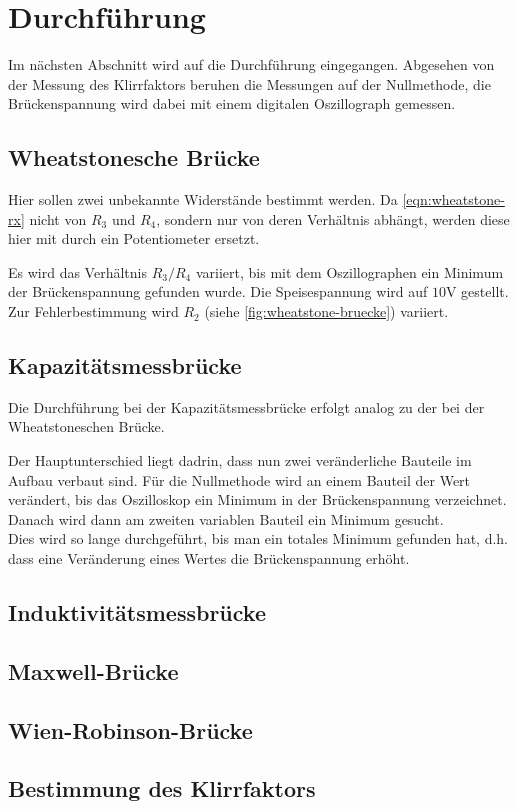 \section{Durchführung}
\label{sec:Durchführung}
Im nächsten Abschnitt wird auf die Durchführung eingegangen. Abgesehen von der Messung des
Klirrfaktors beruhen die Messungen auf der 
Nullmethode, die Brückenspannung wird dabei mit einem digitalen Oszillograph gemessen.

\subsection{Wheatstonesche Brücke}
\label{sec:exec-wheatstone}

Hier sollen zwei unbekannte Widerstände bestimmt werden. Da \autoref{eqn:wheatstone-rx} nicht von 
$R_3$ und $R_4$, sondern nur von deren Verhältnis abhängt,
werden diese hier mit durch ein Potentiometer ersetzt.

Es wird das Verhältnis $R_3/R_4$ variiert, bis mit dem Oszillographen ein Minimum der Brückenspannung
gefunden wurde. Die Speisespannung wird auf $10\si{\volt}$ gestellt. Zur Fehlerbestimmung wird $R_2$
(siehe \autoref{fig:wheatstone-bruecke}) variiert.

\subsection{Kapazitätsmessbrücke}
\label{sec:exec-kapazitaetsmessbrueck}

Die Durchführung bei der Kapazitätsmessbrücke erfolgt analog zu der bei der Wheatstoneschen Brücke.

Der Hauptunterschied liegt dadrin, dass nun zwei veränderliche Bauteile im Aufbau verbaut sind. Für die
Nullmethode wird an einem Bauteil der Wert verändert, bis das Oszilloskop ein Minimum in der Brückenspannung
verzeichnet. Danach wird dann am zweiten variablen Bauteil ein Minimum gesucht.
\\
Dies wird so lange durchgeführt, bis man ein totales Minimum gefunden hat, d.h. dass eine Veränderung eines
Wertes die Brückenspannung erhöht.

\subsection{Induktivitätsmessbrücke}
\label{sec:exec-induktivitätsmessbrücke}

\subsection{Maxwell-Brücke}
\label{sec:exec-maxwell-bruecke}

\subsection{Wien-Robinson-Brücke}
\label{sec:exec-wien-robinson-bruecke}

\subsection{Bestimmung des Klirrfaktors}
\label{sec:exec-klirrfaktors}
